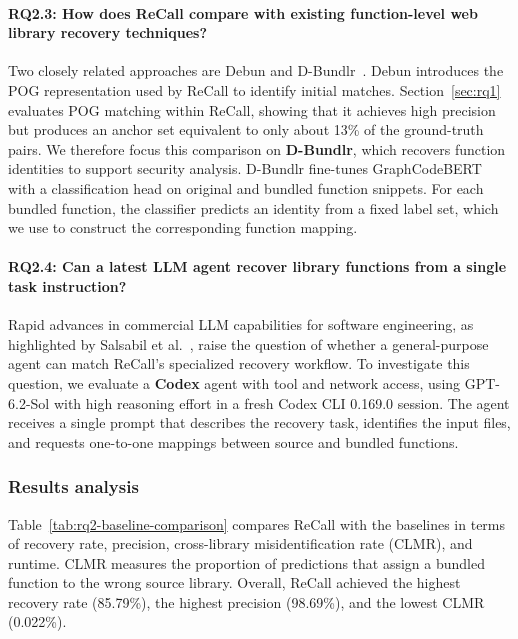 \paragraph{RQ2.3: How does ReCall compare with existing function-level web library recovery techniques?}
Two closely related approaches are Debun and D-Bundlr~\cite{xu2026dbundlr}. Debun introduces the POG representation used by ReCall to identify initial matches. Section~\ref{sec:rq1} evaluates POG matching within ReCall, showing that it achieves high precision but produces an anchor set equivalent to only about 13\% of the ground-truth pairs. We therefore focus this comparison on \textbf{D-Bundlr}, which recovers function identities to support security analysis. D-Bundlr fine-tunes GraphCodeBERT with a classification head on original and bundled function snippets. For each bundled function, the classifier predicts an identity from a fixed label set, which we use to construct the corresponding function mapping.

\paragraph{RQ2.4: Can a latest LLM agent recover library functions from a single task instruction?}
Rapid advances in commercial LLM capabilities for software engineering, as highlighted by Salsabil et al.~\cite{salsabil2026whatsurvives}, raise the question of whether a general-purpose agent can match ReCall's specialized recovery workflow. To investigate this question, we evaluate a \textbf{Codex} agent with tool and network access, using GPT-6.2-Sol with high reasoning effort in a fresh Codex CLI 0.169.0 session. The agent receives a single prompt that describes the recovery task, identifies the input files, and requests one-to-one mappings between source and bundled functions.

\subsubsection{Results analysis}

Table~\ref{tab:rq2-baseline-comparison} compares ReCall with the baselines in terms of recovery rate, precision, cross-library misidentification rate (CLMR), and runtime. CLMR measures the proportion of predictions that assign a bundled function to the wrong source library. Overall, ReCall achieved the highest recovery rate (85.79\%), the highest precision (98.69\%), and the lowest CLMR (0.022\%).

